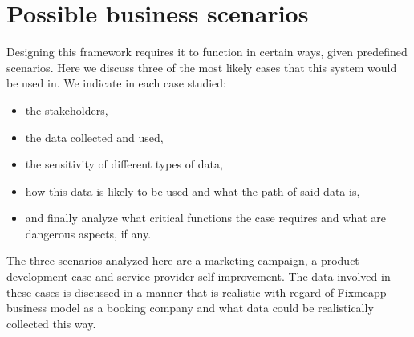 \documentclass[a4paper,11pt]{report} %
\theoremstyle{change}
\theoremstyle{theoremstyle}
\begin{document}
\section{Possible business scenarios}\label{sec: business_scen}
Designing this framework requires it to function in certain ways, given predefined scenarios. Here we discuss three of the most likely cases that this system would be used in. We indicate in each case studied:
\begin{itemize}
    \item the stakeholders,
    \item the data collected and used,
    \item the sensitivity of different types of data,
    \item how this data is likely to be used and what the path of said data is,
    \item and finally analyze what critical functions the case requires and what are dangerous aspects, if any.
\end{itemize} 
The three scenarios analyzed here are a marketing campaign, a product development case and service provider self-improvement. The data involved in these cases is discussed in a manner that is realistic with regard of Fixmeapp business model as a booking company and what data could be realistically collected this way.
\end{document}
